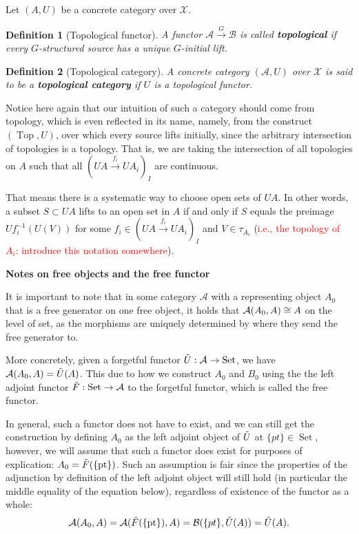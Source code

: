 \documentclass[12pt,a4paper]{article}
\newtheorem{definition}{Definition}[section] %
\DeclareMathOperator{\Set}{Set}
\DeclareMathOperator{\Top}{Top}
\def\HomA{\ensuremath\mathcal{A}}
\def\HomB{\ensuremath\mathcal{B}}
\def\t{\ensuremath\tilde}
\begin{document}
Let $(A, U)$ be a concrete category over $\mathcal{X}$. 
\begin{definition}[Topological functor]
A functor $\mathcal{A} \stackrel{G}{\to}\mathcal{B}$ is called \textbf{topological} if every $G$-structured source has a unique $G$-initial lift. 
 \end{definition}
 
 \begin{definition}[Topological category]
 A concrete category $(\mathcal{A}, U)$ over $\mathcal{X}$ is said to be a \textbf{topological category} if $U$ is a topological functor. 
 \end{definition}
 
 Notice here again that our intuition of such a category should come from topology, which is even reflected in its name, namely, from the construct $(\Top, U)$,  over which every source lifts initially, since the arbitrary intersection of topologies is a topology. That is, we are taking the intersection of all topologies on $A$ such that all $(UA \stackrel{f_i}{\to} UA_i)_I$ are continuous.
 
  That means there is a systematic way to choose open sets of $UA$. In other words,  a subset $S \subset UA$ lifts to an open set in $A$ if and only if $S$ equals the preimage $Uf_i^{-1}(U(V))$ for some  $f_i \in (UA \stackrel{f_i}{\to} UA_i)_I$ and $V \in  \tau_{A_i}$ (\textcolor{red}{i.e., the topology of $A_i$: introduce this notation somewhere}).
 

\textbf{Notes on free objects and the free functor}

It is important to note that in some category $\mathcal{A}$ with a representing object $A_0$ that is a free generator on one free object, it holds that $\HomA(A_0,A) \cong A$ on the level of set, as the morphisms are uniquely determined by where they send the free generator to. 

More concretely, given a forgetful functor $\t U: \mathcal{A} \to \Set$, we have $\HomA(A_0,A) = \t U(A)$. This due to how we construct $A_0$ and $B_0$ using the the left adjoint functor $\t F: \Set \to \mathcal{A}$ to the forgetful functor, which is called the free functor. 

In general, such a functor does not have to exist, and we can still get the construction by defining $A_0$ as the left adjoint object of $\t U$ at $\{pt\} \in \Set$, however, we will assume that such a functor does exist for purposes of explication: $A_0 = \t F(\{\text{pt}\})$. Such an assumption is fair since the properties of the adjunction by definition of the left adjoint object will still hold (in particular the middle equality of the equation below), regardless of existence of the functor as a whole: \begin{align*}
	\HomA(A_0, A) = \HomA(\t F(\{\text{pt}\}), A) = \HomB(\{pt\}, \t U(A)) = \t U(A).
\end{align*}
\end{document}
